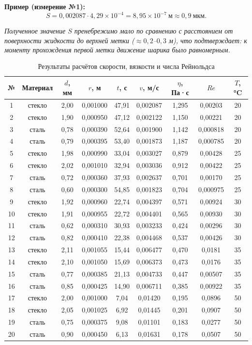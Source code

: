 \documentclass[a4paper, 12pt]{article}
\begin{document}
\textbf{Пример (измерение №1):}
\[
S = 0{,}002087 \cdot 4{,}29 \times 10^{-4} = 8{,}95 \times 10^{-7}\ \text{м} \approx 0{,}9\ \text{мкм}.
\]

\textit{Полученное значение \(S\) пренебрежимо мало по сравнению с расстоянием от поверхности жидкости до верхней метки (\(\approx 0{,}2\)–\(0{,}3\) м), что подтверждает: к моменту прохождения первой метки движение шарика было равномерным.}



\begin{table}[H]
\centering
\caption{Результаты расчётов скорости, вязкости и числа Рейнольдса}
\label{tab:results}
\small %
\begin{tabular}{|c|c|c|c|c|c|c|c|c|}
\hline
№ & Материал & \(d\), мм & \(r\), м & \(t\), с & \(v\), м/с & \(\eta\), Па·с & \(Re\) & \(T\), °C \\
\hline
1  & стекло & 2,00 & 0,001000 & 47,91 & 0,002087 & 1,295 & 0,00203 & 20 \\
2  & стекло & 1,90 & 0,000950 & 47,12 & 0,002122 & 1,150 & 0,00221 & 20 \\
3  & сталь  & 0,78 & 0,000390 & 52,64 & 0,001900 & 1,142 & 0,000818 & 20 \\
4  & сталь  & 0,79 & 0,000395 & 53,40 & 0,001873 & 1,187 & 0,000785 & 20 \\
5  & стекло & 1,98 & 0,000990 & 33,04 & 0,003027 & 0,879 & 0,00428 & 25 \\
6  & стекло & 2,02 & 0,001010 & 32,94 & 0,003036 & 0,912 & 0,00422 & 25 \\
7  & сталь  & 0,72 & 0,000360 & 37,93 & 0,002637 & 0,701 & 0,00170 & 25 \\
8  & сталь  & 0,60 & 0,000300 & 54,85 & 0,001823 & 0,704 & 0,000975 & 25 \\
9  & стекло & 1,92 & 0,000960 & 22,74 & 0,004397 & 0,571 & 0,00924 & 30 \\
10 & стекло & 1,91 & 0,000955 & 22,72 & 0,004401 & 0,565 & 0,00930 & 30 \\
11 & сталь  & 0,62 & 0,000310 & 30,93 & 0,003233 & 0,424 & 0,00296 & 30 \\
12 & сталь  & 0,82 & 0,000410 & 22,38 & 0,004468 & 0,537 & 0,00426 & 30 \\
13 & стекло & 2,11 & 0,001055 & 15,44 & 0,006477 & 0,470 & 0,0181  & 35 \\
14 & стекло & 2,10 & 0,001050 & 15,69 & 0,006373 & 0,473 & 0,0176  & 35 \\
15 & сталь  & 0,77 & 0,000385 & 21,13 & 0,004733 & 0,447 & 0,00507 & 35 \\
16 & сталь  & 0,85 & 0,000425 & 14,90 & 0,006711 & 0,385 & 0,00922 & 35 \\
17 & стекло & 2,00 & 0,001000 & 7,04  & 0,01420  & 0,195 & 0,0896  & 50 \\
18 & стекло & 2,05 & 0,001025 & 6,92  & 0,01445  & 0,201 & 0,0907  & 50 \\
19 & сталь  & 0,75 & 0,000375 & 9,08  & 0,01101  & 0,183 & 0,0277  & 50 \\
20 & сталь  & 0,90 & 0,000450 & 6,13  & 0,01631  & 0,178 & 0,0507  & 50 \\
\hline
\end{tabular}
\end{table}
\end{document}
